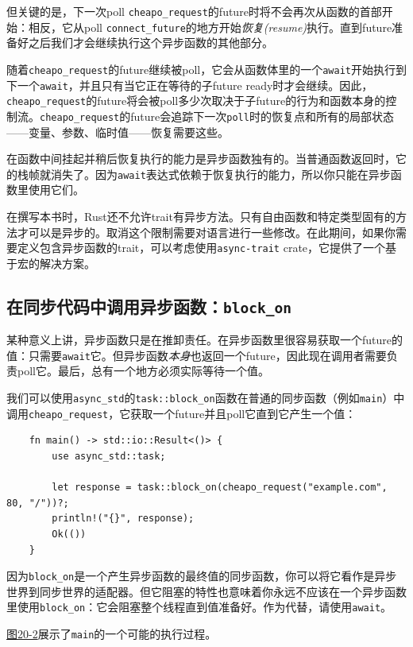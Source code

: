 但关键的是，下一次poll \texttt{cheapo\_request}的future时将不会再次从函数的首部开始：相反，它从poll \texttt{connect\_future}的地方开始\emph{恢复(resume)}执行。直到future准备好之后我们才会继续执行这个异步函数的其他部分。

随着\texttt{cheapo\_request}的future继续被poll，它会从函数体里的一个\texttt{await}开始执行到下一个\texttt{await}，并且只有当它正在等待的子future ready时才会继续。因此，\texttt{cheapo\_request}的future将会被poll多少次取决于子future的行为和函数本身的控制流。\texttt{cheapo\_request}的future会追踪下一次\texttt{poll}时的恢复点和所有的局部状态——变量、参数、临时值——恢复需要这些。

在函数中间挂起并稍后恢复执行的能力是异步函数独有的。当普通函数返回时，它的栈帧就消失了。因为\texttt{await}表达式依赖于恢复执行的能力，所以你只能在异步函数里使用它们。

在撰写本书时，Rust还不允许trait有异步方法。只有自由函数和特定类型固有的方法才可以是异步的。取消这个限制需要对语言进行一些修改。在此期间，如果你需要定义包含异步函数的trait，可以考虑使用\texttt{async-trait} crate，它提供了一个基于宏的解决方案。

\subsection{在同步代码中调用异步函数：\texttt{block\_on}}
某种意义上讲，异步函数只是在推卸责任。在异步函数里很容易获取一个future的值：只需要\texttt{await}它。但异步函数\emph{本身}也返回一个future，因此现在调用者需要负责poll它。最后，总有一个地方必须实际等待一个值。

我们可以使用\texttt{async\_std}的\texttt{task::block\_on}函数在普通的同步函数（例如\texttt{main}）中调用\texttt{cheapo\_request}，它获取一个future并且poll它直到它产生一个值：
\begin{verbatim}
    fn main() -> std::io::Result<()> {
        use async_std::task;

        let response = task::block_on(cheapo_request("example.com", 80, "/"))?;
        println!("{}", response);
        Ok(())
    }
\end{verbatim}

因为\texttt{block\_on}是一个产生异步函数的最终值的同步函数，你可以将它看作是异步世界到同步世界的适配器。但它阻塞的特性也意味着你永远不应该在一个异步函数里使用\texttt{block\_on}：它会阻塞整个线程直到值准备好。作为代替，请使用\texttt{await}。

\hyperref[f20-2]{图20-2}展示了\texttt{main}的一个可能的执行过程。

